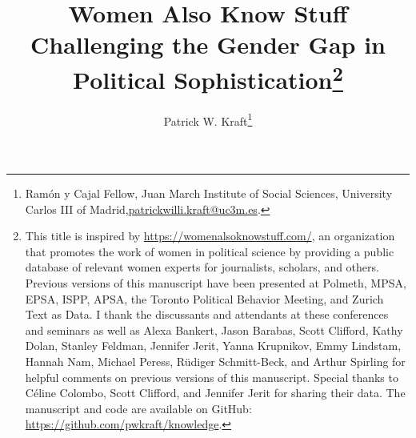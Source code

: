 \documentclass[12pt]{article}
\author{Patrick W. Kraft\footnote{Ramón y Cajal Fellow, Juan March Institute of Social Sciences,  University Carlos III of Madrid,\newline \href{mailto:patrickwilli.kraft@uc3m.es}{patrickwilli.kraft@uc3m.es}.}}
\title{Women Also Know Stuff \\
\large{Challenging the Gender Gap in Political Sophistication}\footnote{This title is inspired by \url{https://womenalsoknowstuff.com/}, an organization that promotes the work of women in political science by providing a public database of relevant women experts for journalists, scholars, and others. Previous versions of this manuscript have been presented at Polmeth, MPSA, EPSA, ISPP, APSA, the Toronto Political Behavior Meeting, and Zurich Text as Data. I thank the discussants and attendants at these conferences and seminars as well as Alexa Bankert, Jason Barabas, Scott Clifford, Kathy Dolan, Stanley Feldman, Jennifer Jerit, Yanna Krupnikov, Emmy Lindstam, Hannah Nam, Michael Peress, R\"udiger Schmitt-Beck, and Arthur Spirling for helpful comments on previous versions of this manuscript. Special thanks to C{\'e}line Colombo, Scott Clifford, and Jennifer Jerit for sharing their data. The manuscript and code are available on GitHub: \url{https://github.com/pwkraft/knowledge}.
}}
\date{}
\begin{document}
\doublespacing




\end{document}

